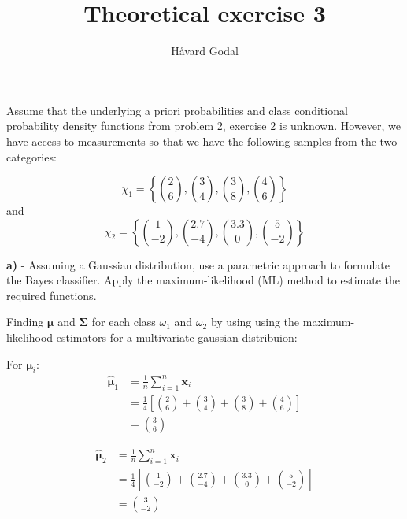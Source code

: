 \documentclass{homeworg}
\title{Theoretical exercise 3}
\author{Håvard Godal}
\begin{document}
\maketitle

\problem

Assume that the underlying a priori probabilities and class conditional 
probability density functions from problem 2, exercise 2 is unknown. 
However, we have access to measurements so that we have the following samples 
from the two categories:

\begin{equation}
    \chi_1 = \left\{\binom{2}{6}, \binom{3}{4}, \binom{3}{8}, \binom{4}{6}\right\}
\end{equation}
and
\begin{equation}
    \chi_2 = \left\{\binom{1}{-2}, \binom{2.7}{-4}, \binom{3.3}{0}, \binom{5}{-2}\right\}
\end{equation}

\bigskip
\newpage
\textbf{a)} - Assuming a Gaussian distribution, use a parametric approach to formulate the Bayes classifier. Apply the maximum-likelihood (ML) method to estimate the required functions.
\smallskip

Finding $\bm{\mu}$ and $\bm{\Sigma}$ for each class $\omega_1$ and $\omega_2$ by using using the maximum-likelihood-estimators for a multivariate gaussian distribuion:

For $\bm{\mu}_i$:
\begin{equation}
    \begin{aligned}
        \bm{\hat{\mu}}_1 &= \frac{1}{n}\sum_{i=1}^n \bm{x}_i
        \\
        &= \frac{1}{4}\left[ \binom{2}{6} + \binom{3}{4} + \binom{3}{8} + \binom{4}{6} \right]
        \\
        &= \binom{3}{6}
    \end{aligned}
\end{equation}

\begin{equation}
    \begin{aligned}
        \bm{\hat{\mu}}_2 &= \frac{1}{n}\sum_{i=1}^n \bm{x}_i
        \\
        &= \frac{1}{4}\left[ \binom{1}{-2} + \binom{2.7}{-4} + \binom{3.3}{0} + \binom{5}{-2} \right]
        \\
        &= \binom{3}{-2}
    \end{aligned}
\end{equation}
\end{document}
